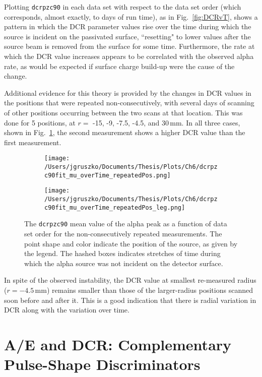 Plotting {\tt dcrpzc90} in each data set with respect to the data set order (which corresponds, almost exactly, to days of run time), as in Fig.~\ref{fig:DCRvT}, shows a pattern in which the DCR parameter values rise over the time during which the source is incident on the passivated surface, ``resetting" to lower values after the source beam is removed from the surface for some time. Furthermore, the rate at which the DCR value increases appears to be correlated with the observed alpha rate, as would be expected if surface charge build-up were the cause of the change. 

Additional evidence for this theory is provided by the changes in DCR values in the positions that were repeated non-consecutively, with several days of scanning of other positions occurring between the two scans at that location. This was done for 5 positions, at $r= $ -15, -9, -7.5, -4.5, and 30\,mm. In all three cases, shown in Fig.~\ref{fig:DCR_repeated}, the second measurement shows a higher DCR value than the first measurement.  

\begin{figure}[t]
 \centering
 \begin{subfigure}[]{.7\textwidth}
 \texttt{[image: /Users/jgruszko/Documents/Thesis/Plots/Ch6/dcrpzc90fit\_mu\_overTime\_repeatedPos.png]}
 \end{subfigure}
  \begin{subfigure}[]{.25\textwidth}
 \texttt{[image: /Users/jgruszko/Documents/Thesis/Plots/Ch6/dcrpzc90fit\_mu\_overTime\_repeatedPos\_leg.png]}
  \end{subfigure}
 \caption[The change in DCR parameter values over time at repeated scan positions] {The {\tt dcrpzc90} mean value of the alpha peak as a function of data set order for the non-consecutively repeated measurements. The point shape and color indicate the position of the source, as given by the legend. The hashed boxes indicates stretches of time during which the alpha source was not incident on the detector surface.} 
 \label{fig:DCR_repeated}
\end{figure}

In spite of the observed instability, the DCR value at smallest re-measured radius ($r =-4.5$\,mm) remains smaller than those of the larger-radius positions scanned soon before and after it. This is a good indication that there is radial variation in DCR along with the variation over time.


\section{A/E and DCR: Complementary Pulse-Shape Discriminators} 
